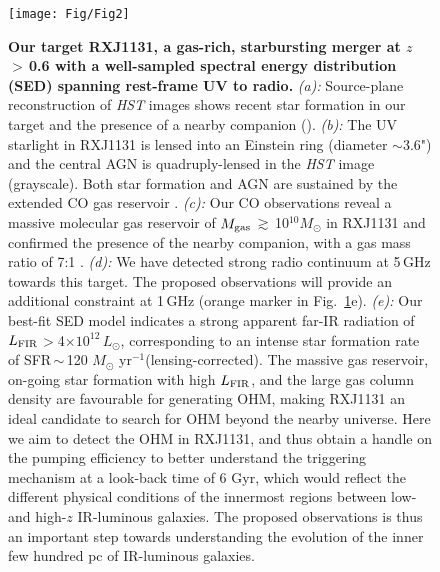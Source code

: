 \documentclass[letterpaper,11pt]{article}
\newcommand{\Lsun}{\mbox{$L_{\odot}$}\xspace}
\newcommand{\Msun}{\mbox{$M_{\odot}$}\xspace}
\newcommand{\LFIR}{\mbox{$L_{\rm FIR}$}\xspace}
\newcommand{\pmOne}{\mbox{$^{-1}$}\xspace}
\newcommand{\Fig}[1]{Fig.~\ref{fig:#1}}
\newcommand{\E}[1]{\mbox{$\times10^{#1}$}}
\newcommand{\ssim}{\,$\sim$\,}
\newcommand{\obs}{observations\xspace}
\begin{document}
\begin{figure}[ptbh]
\centering
\texttt{[image: Fig/Fig2]} 
\vspace{-0.25em}
\caption{
{\bf Our target RXJ1131, a gas-rich, starbursting merger at $z$\,$>$\,0.6 with a well-sampled spectral energy distribution (SED) spanning rest-frame UV to radio.} 
{\em (a):} Source-plane reconstruction of {\it HST} images shows recent star formation in our target and
the presence of a nearby companion (\citealt{Claeskens06a}).
{\em (b):} 
The UV starlight in RXJ1131 is lensed into an Einstein ring (diameter $\sim$3.6") and the central AGN is 
quadruply-lensed in the {\it HST} image (grayscale). Both star formation and AGN are sustained 
by the extended CO gas reservoir \citep[contours; ][]{Leung17a}. 
{\em (c):}
Our CO \obs reveal a massive molecular gas reservoir of $M_{\rm gas}$\,$\gtrsim$\,10$^{10}$\Msun in RXJ1131 and 
confirmed the presence of the nearby companion, with a gas mass ratio of 7:1 \citep{Leung17a}. 
{\em (d):}
We have detected strong radio continuum at 5\,GHz towards this target. 
The proposed \obs will provide an additional constraint at 1\,GHz (orange marker in \Fig{hst}e).
{\em (e):} Our best-fit SED model indicates a strong apparent far-IR radiation of \LFIR$>$4\E{12}\,\Lsun, corresponding to
an intense star formation rate of SFR\ssim120 \Msun yr\pmOne (lensing-corrected).
The massive gas reservoir, on-going star formation with high \LFIR, and the large gas column density
are favourable for generating OHM, making RXJ1131 an
ideal candidate to search for OHM beyond the nearby universe.
Here we aim to detect the OHM in RXJ1131, and thus obtain a handle on the pumping efficiency
to better understand the triggering mechanism at a look-back time of 6 Gyr, which 
would reflect the different physical conditions of the innermost regions between low- and high-$z$ IR-luminous galaxies.
The proposed \obs is thus an important step towards understanding the evolution of the inner few hundred pc of
IR-luminous galaxies.
\label{fig:hst}}
\end{figure}
\end{document}
